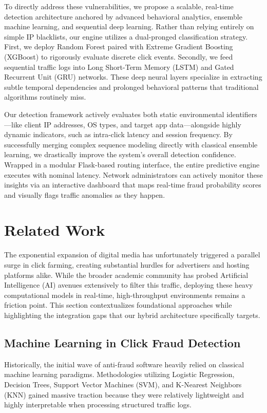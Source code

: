 \documentclass[conference]{IEEEtran}
\begin{document}
To directly address these vulnerabilities, we propose a scalable, real-time detection architecture anchored by advanced behavioral analytics, ensemble machine learning, and sequential deep learning. Rather than relying entirely on simple IP blacklists, our engine utilizes a dual-pronged classification strategy. First, we deploy Random Forest paired with Extreme Gradient Boosting (XGBoost) to rigorously evaluate discrete click events. Secondly, we feed sequential traffic logs into Long Short-Term Memory (LSTM) and Gated Recurrent Unit (GRU) networks. These deep neural layers specialize in extracting subtle temporal dependencies and prolonged behavioral patterns that traditional algorithms routinely miss.

Our detection framework actively evaluates both static environmental identifiers---like client IP addresses, OS types, and target app data---alongside highly dynamic indicators, such as intra-click latency and session frequency. By successfully merging complex sequence modeling directly with classical ensemble learning, we drastically improve the system's overall detection confidence. Wrapped in a modular Flask-based routing interface, the entire predictive engine executes with nominal latency. Network administrators can actively monitor these insights via an interactive dashboard that maps real-time fraud probability scores and visually flags traffic anomalies as they happen.

\section{Related Work}
The exponential expansion of digital media has unfortunately triggered a parallel surge in click farming, creating substantial hurdles for advertisers and hosting platforms alike. While the broader academic community has probed Artificial Intelligence (AI) avenues extensively to filter this traffic, deploying these heavy computational models in real-time, high-throughput environments remains a friction point. This section contextualizes foundational approaches while highlighting the integration gaps that our hybrid architecture specifically targets.

\subsection{Machine Learning in Click Fraud Detection}
Historically, the initial wave of anti-fraud software heavily relied on classical machine learning paradigms. Methodologies utilizing Logistic Regression, Decision Trees, Support Vector Machines (SVM), and K-Nearest Neighbors (KNN) gained massive traction because they were relatively lightweight and highly interpretable when processing structured traffic logs. 
\end{document}
